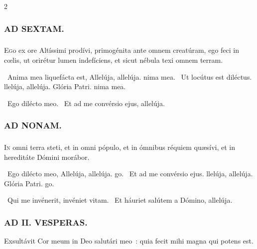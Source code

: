 \documentclass[9pt,twoside]{extarticle}
\begin{document}
\begin{multicols}{2}
\subsubsection*{\center \textsc{AD SEXTAM.}}
\subsubsection*{}
\lettrine{E}go ex ore Altíssimi prodívi, primogénita ante omnem creatúram, ego feci in cœlis, ut orirétur lumen indefíciens, et sicut nébula texi omnem terram.

\begin{tightlist}{}
\item {}~Anima mea liquefácta est, \textred{*} Allelúja, allelúja. nima mea.
~Ut locútus est diléctus. llelúja, allelúja.
Glória Patri. nima mea.
\item {}~Ego dilécto meo. ~Et ad me convérsio ejus, allelúja.
\end{tightlist}

\subsubsection*{\center \textsc{AD NONAM.}}
\subsubsection*{}
\lettrine{I}n omni terra steti, et in omni pópulo, et in ómnibus réquiem quæsívi, et in hereditáte Dómini morábor.

\begin{tightlist}{}
\item {}~Ego dilécto meo, \textred{*} Allelúja, allelúja. go.
~Et ad me convérsio ejus. llelúja, allelúja.
Glória Patri. go.
\item {}~Qui me invénerit, invéniet vitam. ~Et háuriet salútem a Dómino, allelúja.
\end{tightlist}

\subsubsection*{\center \textsc{AD II. VESPERAS.}}
\begin{tightlist}{}
\item {}
\item {}
\item {} Exsultávit Cor meum in Deo salutári meo~: quia fecit mihi magna qui potens est.
\item {}
\end{tightlist}


\end{multicols}
\end{document}
